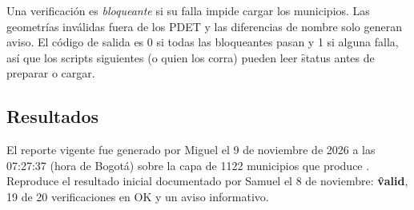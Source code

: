 Una verificación es \emph{bloqueante} si su falla impide cargar los municipios. Las geometrías inválidas fuera de los PDET y las diferencias de nombre solo generan aviso. El código de salida es 0 si todas las bloqueantes pasan y 1 si alguna falla, así que los scripts siguientes (o quien los corra) pueden leer \f{status} antes de preparar o cargar.

\subsection{Resultados}

El reporte vigente fue generado por Miguel el 9 de noviembre de 2026 a las 07:27:37 (hora de Bogotá) sobre la capa de 1122 municipios que produce . Reproduce el resultado inicial documentado por Samuel el 8 de noviembre: \textbf{\f{valid}}, 19 de 20 verificaciones en OK y un aviso informativo.

